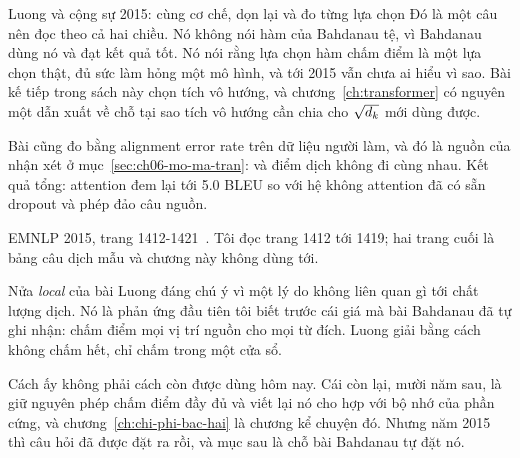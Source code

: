\begin{bridge}{Luong và cộng sự 2015: cùng cơ chế, dọn lại và đo từng lựa chọn}
Đó là một câu nên đọc theo cả hai chiều. Nó không nói hàm của Bahdanau tệ, vì
Bahdanau dùng nó và đạt kết quả tốt. Nó nói rằng lựa chọn hàm chấm điểm là một
lựa chọn thật, đủ sức làm hỏng một mô hình, và tới 2015 vẫn chưa ai hiểu vì
sao. Bài kế tiếp trong sách này chọn tích vô hướng, và
chương~\ref{ch:transformer} có nguyên một dẫn xuất về chỗ tại sao tích vô hướng
cần chia cho \(\sqrt{d_{k}}\) mới dùng được.

Bài cũng đo  bằng alignment error rate trên dữ liệu
người làm, và
đó là nguồn của nhận xét ở mục~\ref{sec:ch06-mo-ma-tran}:
 và điểm dịch không đi cùng nhau. Kết quả
tổng: attention đem lại tới 5.0 BLEU so
với hệ không attention đã có sẵn dropout và phép đảo câu nguồn.

EMNLP 2015, trang 1412-1421~\autocite{luong2015effective}. Tôi đọc trang 1412
tới 1419; hai trang cuối là bảng câu dịch mẫu và chương này không dùng tới.
\end{bridge}

%
Nửa \emph{local} của bài Luong đáng chú ý vì một lý do không liên quan gì tới
chất lượng dịch. Nó là phản ứng đầu tiên tôi biết trước cái giá mà bài Bahdanau
đã tự ghi nhận: chấm điểm mọi vị trí nguồn cho mọi từ đích. Luong giải bằng
cách không chấm hết, chỉ chấm trong một cửa sổ.

Cách ấy không phải cách còn được dùng hôm nay. Cái còn lại, mười năm sau, là
giữ nguyên phép chấm điểm đầy đủ và viết lại nó cho hợp với bộ nhớ của phần
cứng, và chương~\ref{ch:chi-phi-bac-hai} là chương kể chuyện đó. Nhưng năm 2015 thì câu
hỏi đã được đặt ra rồi, và mục sau là chỗ bài Bahdanau tự đặt nó.
